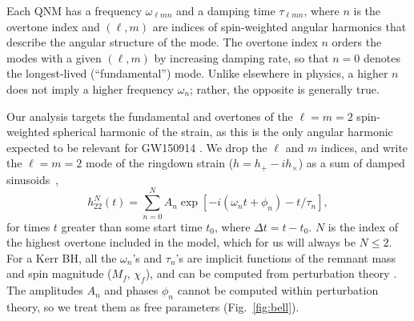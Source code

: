 \documentclass[letterpaper]{article}
\newcommand{\beq}{\begin{equation}}
\newcommand{\eeq}{\end{equation}}
\newcommand*{\fig}[1]{Fig.~\ref{fig:#1}}
\newcommand{\mf}{M_f}
\newcommand{\chif}{\chi_f}
\begin{document}
Each QNM has a frequency $\omega_{\ell m n}$ and a damping time $\tau_{\ell m n}$, where $n$ is the overtone index and $(\ell,m)$ are indices of spin-weighted angular harmonics that describe the angular structure of the mode.
The overtone index $n$ orders the modes with a given $(\ell,m)$ by increasing damping rate, so that $n=0$ denotes the longest-lived (``fundamental'') mode.
Unlike elsewhere in physics, a higher $n$ does not imply a higher frequency $\omega_n$; rather, the opposite is generally true.

Our analysis targets the fundamental and overtones of the $\ell=m=2$ spin-weighted spherical harmonic of the strain, as this is the only angular harmonic expected to be relevant for GW150914 \cite{Abbott:2016apu,Abbott:2016wiq,Carullo:2019flw}.
We drop the $\ell$ and $m$ indices, and write the $\ell=m=2$ mode of the ringdown strain ($h=h_+ - i h_\times$) as a sum of damped sinusoids~\cite{Vishveshwara1970b,Press1971,Teukolsky,ChandraDetweiler1975},
\beq\label{eq:qnm}
  h_{22}^{N}(t) = \sum\limits_{n=0}^{N} A_n \exp\left[-i \left(\omega_n t + \phi_n\right) - t/\tau_n\right] ,
\eeq
for times $t$ greater than some start time $t_0$, where $\Delta t = t-t_0$.
$N$ is the index of the highest overtone included in the model, which for us will always be $N\leq 2$.
For a Kerr BH, all the $\omega_n$'s and  $\tau_n$'s are implicit functions of the remnant mass and spin magnitude ($\mf,\, \chif$), and can be computed from perturbation theory \cite{Leaver1985,Berti2009,BertiWebsite}.
The amplitudes $A_n$ and phases $\phi_n$ cannot be computed within perturbation theory, so we treat them as free parameters (\fig{bell}).
\end{document}
